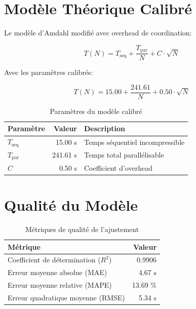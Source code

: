 \documentclass[11pt,a4paper]{article}
\begin{document}
\section{Modèle Théorique Calibré}

Le modèle d'Amdahl modifié avec overhead de coordination:

\begin{equation}
\boxed{T(N) = T_{\text{seq}} + \frac{T_{\text{par}}}{N} + C \cdot \sqrt{N}}
\end{equation}

Avec les paramètres calibrés:

\begin{equation}
\boxed{T(N) = 15.00 + \frac{241.61}{N} + 0.50 \cdot \sqrt{N}}
\end{equation}

\begin{table}[h]
\centering
\caption{Paramètres du modèle calibré}
\begin{tabular}{lrl}
\toprule
\textbf{Paramètre} & \textbf{Valeur} & \textbf{Description} \\
\midrule
$T_{\text{seq}}$ & 15.00 s & Temps séquentiel incompressible \\
$T_{\text{par}}$ & 241.61 s & Temps total parallélisable \\
$C$ & 0.50 s & Coefficient d'overhead \\
\bottomrule
\end{tabular}
\end{table}

\section{Qualité du Modèle}

\begin{table}[h]
\centering
\caption{Métriques de qualité de l'ajustement}
\begin{tabular}{lr}
\toprule
\textbf{Métrique} & \textbf{Valeur} \\
\midrule
Coefficient de détermination ($R^2$) & 0.9906 \\
Erreur moyenne absolue (MAE) & 4.67 s \\
Erreur moyenne relative (MAPE) & 13.69 \% \\
Erreur quadratique moyenne (RMSE) & 5.34 s \\
\bottomrule
\end{tabular}
\end{table}
\end{document}
